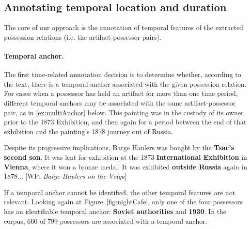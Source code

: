 \subsection{Annotating temporal location and duration} \label{sec:temporal}



The core of our approach is the annotation of temporal features of the extracted possession relations (i.e. the artifact-possessor pairs). 

\paragraph{Temporal anchor.}
The first time-related annotation decision is to determine whether, according to the text, there is a temporal anchor associated with the given possession relation. 
For cases when a possessor has held an artifact for more than one time period, different temporal anchors may be associated with the same artifact-possessor pair, as in \ref{ex:multiAnchor} below. 
This painting was in the custody of its owner prior to the 1873 Exhibition, and then again for a period between the end of that exhibition and the painting's 1878 journey out of Russia.

\begin{example}
Despite its progressive implications, Barge Haulers was bought by the \textbf{Tsar's second son}. It was lent for exhibition at the 1873 \textbf{International Exhibition} in \textbf{Vienna}, where it won a bronze medal. It was exhibited \textbf{outside Russia} again in 1878... {\small[WP: \textit{Barge Haulers on the Volga}]} \label{ex:multiAnchor}
\end{example}




\noindent
If a temporal anchor cannot be identified, the other temporal features are not relevant. 
Looking again at Figure~\ref{fig:nightCafe}, only one of the four possessors has an identifiable temporal anchor: \textbf{Soviet authorities} and \textbf{1930}.
In the corpus, 660 of 799 possessors are associated with a temporal anchor.




